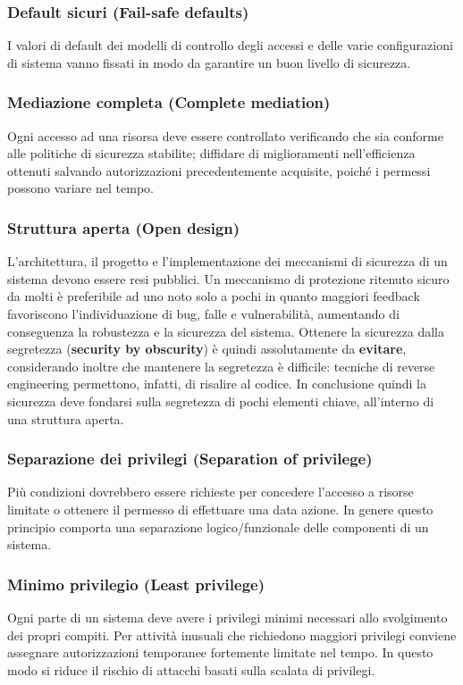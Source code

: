 \subsubsection{Default sicuri (Fail-safe defaults)}
I valori di default dei modelli di controllo degli accessi e delle varie configurazioni di sistema vanno fissati in modo da garantire un buon livello di sicurezza.

\subsubsection{Mediazione completa (Complete mediation)} 
Ogni accesso ad una risorsa deve essere controllato verificando che sia conforme alle politiche di sicurezza stabilite; diffidare di miglioramenti nell'efficienza ottenuti salvando autorizzazioni precedentemente acquisite, poiché i permessi possono variare nel tempo.

\subsubsection{Struttura aperta (Open design)} 
\label{sec:openStruct}  
L'architettura, il progetto e l'implementazione dei meccanismi di sicurezza di un sistema devono essere resi pubblici. Un meccanismo di protezione ritenuto sicuro da molti è preferibile ad uno noto solo a pochi in quanto maggiori feedback favoriscono l'individuazione di bug, falle e vulnerabilità, aumentando di conseguenza la robustezza e la sicurezza del sistema. Ottenere la sicurezza dalla segretezza (\textbf{security by obscurity}) è quindi assolutamente da \textbf{evitare}, considerando inoltre che mantenere la segretezza è difficile: tecniche di reverse engineering permettono, infatti, di risalire al codice. In conclusione quindi la sicurezza deve fondarsi sulla segretezza di pochi elementi chiave, all'interno di una struttura aperta.

\subsubsection{Separazione dei privilegi (Separation of privilege)} 
Più condizioni dovrebbero essere richieste per concedere l'accesso a risorse limitate o ottenere il permesso di effettuare una data azione. In genere questo principio comporta una separazione logico/funzionale delle componenti di un sistema.

\subsubsection{Minimo privilegio (Least privilege)} 
Ogni parte di un sistema deve avere i privilegi minimi necessari allo svolgimento dei propri compiti. Per attività inusuali che richiedono maggiori privilegi conviene assegnare autorizzazioni temporanee fortemente limitate nel tempo. In questo modo si riduce il rischio di attacchi basati sulla scalata di privilegi.

